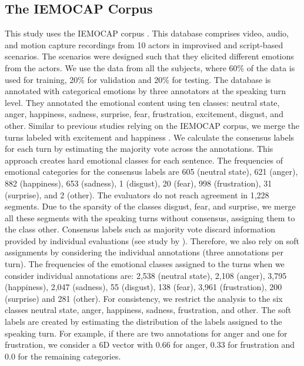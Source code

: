 \documentclass[10pt,journal,compsoc]{IEEEtran}
\begin{document}
\subsection{The IEMOCAP Corpus}
\label{ssec:iemocap}


This study uses the IEMOCAP corpus \cite{Busso_2008_5}. This database comprises video, audio, and motion capture recordings from 10 actors in improvised and script-based scenarios. The scenarios were designed such that they elicited different emotions from the actors. We use the data from all the subjects, where 60\% of the data is used for training, 20\% for validation and 20\% for testing. The database is annotated with categorical emotions by three annotators at the speaking turn level. They annotated the emotional content using ten classes: neutral state, anger, happiness, sadness, surprise, fear, frustration, excitement, disgust, and other. Similar to previous studies relying on the IEMOCAP corpus, we merge the turns labeled with excitement and happiness \cite{Metallinou_2010, Mariooryad_2016}. We calculate the consensus labels for each turn by estimating the majority vote across the annotations. This approach creates hard emotional classes for each sentence. The frequencies of emotional categories for the consensus labels are 605 (neutral state), 621 (anger), 882 (happiness), 653 (sadness), 1 (disgust), 20 (fear), 998 (frustration), 31 (surprise), and 2 (other). The evaluators do not reach agreement in 1,228 segments. Due to the sparsity of the classes disgust, fear, and surprise, we merge all these segments with the speaking turns without consensus, assigning them to the class other. Consensus labels such as majority vote discard information provided by individual evaluations (see study by  \citet{Lotfian_2017}). Therefore, we also rely on soft assignments by considering the individual annotations (three annotations per turn). The frequencies of the emotional classes assigned to the turns when we consider individual annotations are: 2,538 (neutral state), 2,108 (anger), 3,795 (happiness), 2,047 (sadness), 55 (disgust), 138 (fear), 3,961 (frustration), 200 (surprise) and 281 (other). For consistency, we restrict the analysis to the six classes neutral state, anger, happiness, sadness, frustration, and other. The soft labels are created by estimating the distribution of the labels assigned to the speaking turn. For example, if there are two annotations for anger and one for frustration, we consider a 6D vector with 0.66 for anger, 0.33 for frustration and 0.0 for the remaining categories.
\end{document}
